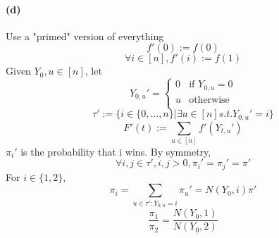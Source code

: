 \documentclass[11pt]{article} %
\begin{document}
\clearpage
\paragraph{(d)}
Use a "primed" version of everything 
\[f'(0) := f(0)\]
\[\forall i \in [n], f'(i) := f(1)\]
Given $Y_0, u\in [n]$, let
\[Y_{0,u}' = \begin{cases}
  0 & \text{if } Y_{0, u} = 0\\
  u & \text{otherwise}\\
\end{cases}
\]
\[\tau' := \{i \in \{0, ..., n\} | \exists u\in [n] s.t. Y_{0, u}' = i \}\]
\[F'(t) := \sum_{u\in[n]} f'(Y_{t,u}')\]
$\pi_i'$ is the probability that i wins.
By symmetry, 
\[\forall i,j\in \tau', i, j > 0, \pi_i' = \pi_j' = \pi'\]
For $i\in \{1,2\}$,
\[\pi_i = \sum_{u\in \tau': Y_{0, u}=i} \pi_u ' = N(Y_0, i) \pi'\]
\[\frac{\pi_1}{\pi_2} = \frac{N(Y_0, 1)}{N(Y_0, 2)}\]
\end{document}
